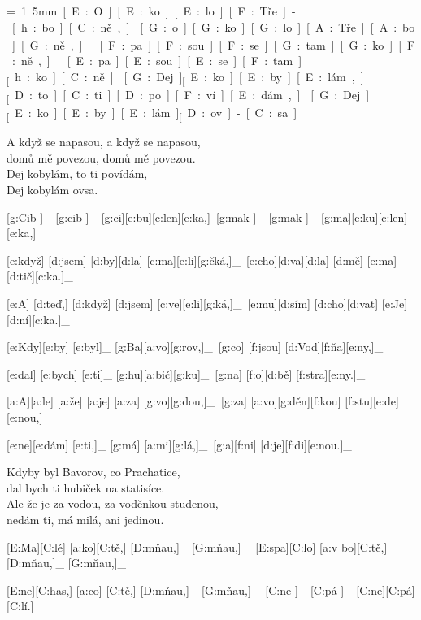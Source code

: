 
{\unit=1.5mm
[E:O][E:ko][E:lo] [F:Tře]-[h:bo][C:ně,]_\

[G:o][G:ko][G:lo] [A:Tře][A:bo][G:ně,]\
[F:pa][F:sou] [F:se] [G:tam] [G:ko][F:ně,]\

[E:pa][E:sou] [E:se] [F:tam]_ [h:ko][C:ně.]_\

[G:Dej]_ [E:ko][E:by][E:lám,]_ [D:to] [C:ti] [D:po][F:ví][E:dám,]_\

[G:Dej]_ [E:ko][E:by][E:lám]_ [D:ov]-[C:sa.]_\
}

A když se napasou, a když se napasou,\\
domů mě povezou, domů mě povezou.\\
Dej kobylám, to ti povídám,\\
Dej kobylám ovsa.



[g:Cib-]_ [g:cib-]_ [g:ci][e:bu][c:len][e:ka,]\
[g:mak-]_ [g:mak-]_ [g:ma][e:ku][c:len][e:ka,]\

[e:když] [d:jsem] [d:by][d:la] [c:ma][e:li][g:čká,]_\
[e:cho][d:va][d:la] [d:mě] [e:ma][d:tič][c:ka.]_\

[e:A] [d:teď,] [d:když] [d:jsem] [c:ve][e:li][g:ká,]_\
[e:mu][d:sím] [d:cho][d:vat] [e:Je][d:ní][c:ka.]_\



[e:Kdy][e:by] [e:byl]_ [g:Ba][a:vo][g:rov,]_\
[g:co] [f:jsou] [d:Vod][f:ňa][e:ny,]_\

[e:dal] [e:bych] [e:ti]_ [g:hu][a:bič][g:ku]_\
[g:na] [f:o][d:bě] [f:stra][e:ny.]_\

[a:A][a:le] [a:že] [a:je] [a:za] [g:vo][g:dou,]_\
[g:za] [a:vo][g:děn][f:kou] [f:stu][e:de][e:nou,]_\

[e:ne][e:dám] [e:ti,]_ [g:má] [a:mi][g:lá,]_\
[g:a][f:ni] [d:je][f:di][e:nou.]_\

Kdyby byl Bavorov, co Prachatice,\\
dal bych ti hubiček na statisíce.\\
Ale že je za vodou, za voděnkou studenou,\\
nedám ti, má milá, ani jedinou.


\pis{Malé kotě}{a}{G}

[E:Ma][C:lé] [a:ko][C:tě,] [D:mňau,]_ [G:mňau,]_\
[E:spa][C:lo] [a:v bo][C:tě,] [D:mňau,]_ [G:mňau,]_\

[E:ne][C:has,] [a:co] [C:tě,] [D:mňau,]_ [G:mňau,]_\
[C:ne-]_ [C:pá-]_ [C:ne][C:pá][C:lí.]\

